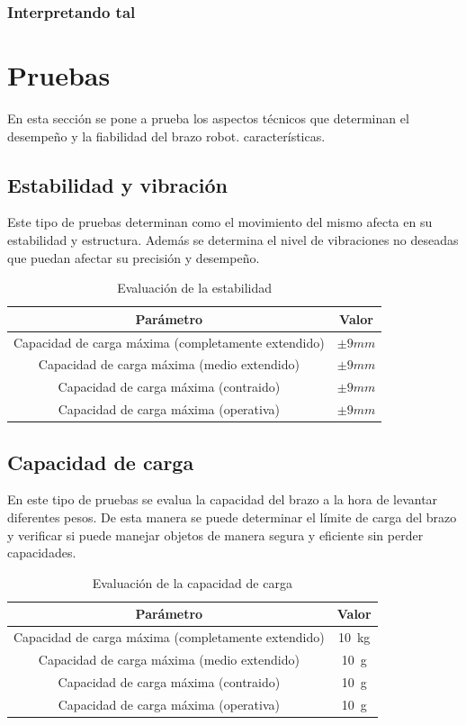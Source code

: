 \subsubsection{Interpretando tal}

\section{Pruebas}
En esta sección se pone a prueba los aspectos técnicos que determinan el desempeño y la fiabilidad del brazo robot. 
características.

\subsection{Estabilidad y vibración}
Este tipo de pruebas determinan como el movimiento del mismo afecta en su estabilidad y estructura. Además se determina el nivel de 
vibraciones no deseadas que puedan afectar su precisión y desempeño.
\begin{table}[H]
\begin{center}
\begin{tabular}{|c|c|}
\hline
\textbf{Parámetro} & \textbf{Valor} \\
\hline
Capacidad de carga máxima (completamente extendido) & $\pm9mm$\\
Capacidad de carga máxima (medio extendido) & $\pm9mm$\\
Capacidad de carga máxima (contraido) & $\pm9mm$\\
Capacidad de carga máxima (operativa) & $\pm9mm$\\
\hline
\end{tabular}
\caption{Evaluación de la estabilidad}
\label{cuadro:evaluacion_estabilidad}
\end{center}
\end{table}

\subsection{Capacidad de carga}
En este tipo de pruebas se evalua la capacidad del brazo a la hora de levantar diferentes pesos. De esta manera se puede determinar 
el límite de carga del brazo y verificar si puede manejar objetos de manera segura y eficiente sin perder capacidades.
\begin{table}[H]
\begin{center}
\begin{tabular}{|c|c|}
\hline
\textbf{Parámetro} & \textbf{Valor} \\
\hline
Capacidad de carga máxima (completamente extendido) & \SI{10}{\kilo\gram} \\
Capacidad de carga máxima (medio extendido) & \SI{10}{\gram} \\
Capacidad de carga máxima (contraido) & \SI{10}{\gram} \\
Capacidad de carga máxima (operativa) & \SI{10}{\gram} \\
\hline
\end{tabular}
\caption{Evaluación de la capacidad de carga}
\label{cuadro:evaluacion_carga}
\end{center}
\end{table}

